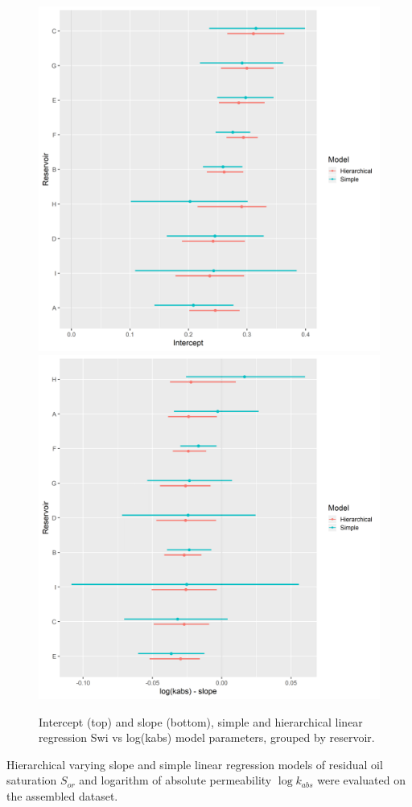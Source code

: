 \documentclass[english,msc,numbers]{coppe}
\begin{document}
  \begin{figure}
  
  {\centering \includegraphics[width=0.75\linewidth]{figure/4-9-swi-coefs-intercept} \includegraphics[width=0.75\linewidth]{figure/4-9-swi-coefs-slopes} 
  
  }
  
  \caption{Intercept (top) and slope (bottom), simple and hierarchical linear regression Swi vs log(kabs) model  parameters, grouped by reservoir.}\label{fig:swi-simple-hierarchical-coefs}
  \end{figure}
  \par
  
  Hierarchical varying slope and simple linear regression models of residual oil saturation \(S_{or}\) and logarithm of absolute permeability \(\log{k_{abs}}\) were evaluated on the assembled dataset.
  
\end{document}
